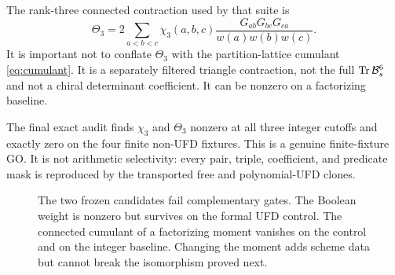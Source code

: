 The rank-three connected contraction used by that suite is
\begin{equation}
 \Theta_3
 =2\sum_{a<b<c}\chi_3(a,b,c)
 \frac{G_{ab}G_{bc}G_{ca}}{w(a)w(b)w(c)}.
 \label{eq:theta3}
\end{equation}
It is important not to conflate \(\Theta_3\) with the partition-lattice
cumulant \eqref{eq:cumulant}.  It is a separately filtered triangle
contraction, not the full \(\operatorname{Tr}\mathcal B_s^6\) and not a chiral
determinant coefficient.  It can be nonzero on a factorizing baseline.

The final exact audit finds \(\chi_3\) and \(\Theta_3\) nonzero at all three
integer cutoffs and exactly zero on the four finite non-UFD fixtures.  This
is a genuine finite-fixture GO.  It is not arithmetic selectivity: every
pair, triple, coefficient, and predicate mask is reproduced by the
transported free and polynomial-UFD clones.

\begin{figure}[t]
\centering

\caption{The two frozen candidates fail complementary gates.  The Boolean
weight is nonzero but survives on the formal UFD control.  The connected
cumulant of a factorizing moment vanishes on the control and on the integer
baseline.  Changing the moment adds scheme data but cannot break the
isomorphism proved next.}
\label{fig:candidate-dichotomy}
\end{figure}
